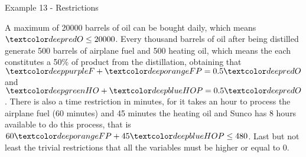 \begin{frame}{Example 13 - Restrictions}

A maximum of 20000 barrels of oil can be bought daily, which means
$\colora{O} \le 20000$. Every thousand barrels of oil after being distilled
generate 500 barrels of airplane fuel and 500 heating oil, which means the each
constitutes a 50\% of product from the distillation, obtaining that
$\colord{F} + \colore{FP} = 0.5\colora{O}$ and
$\colorb{HO} + \colorc{HOP} = 0.5\colora{O}$. There is also a time restriction
in minutes, for it takes an hour to process the airplane fuel (60 minutes) and
45 minutes the heating oil and Sunco has 8 hours available to do this process,
that is $60\colore{FP} + 45\colorc{HOP} \le 480$. Last but not least the trivial
restrictions that all the variables must be higher or equal to 0.

\end{frame}
